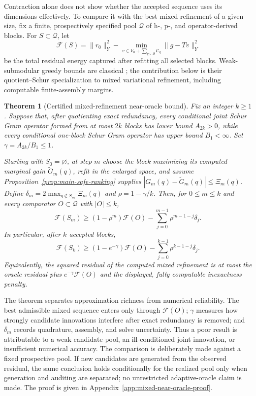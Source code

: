\documentclass[11pt]{article}
\newtheorem{theorem}{Theorem}[section]
\numberwithin{algorithm}{section}
\theoremstyle{definition}\newtheorem{definition}[theorem]{Definition}
\theoremstyle{remark}\newtheorem{remark}[theorem]{Remark}
\begin{document}
Contraction alone does not show whether the accepted sequence uses its
dimensions effectively.  To compare it with the best mixed refinement of a
given size, fix a finite, prospectively specified pool $\mathcal Q$ of h-, p-,
and operator-derived blocks.  For $S\subset\mathcal Q$, let
\begin{equation}
 \mathcal F(S)=\|r_0\|_Y^2-
 \min_{v\in V_0+\sum_{q\in S}\mathcal C_q}\|g-Tv\|_Y^2
 \label{eq:captured-gain-set-function}
\end{equation}
be the total residual energy captured after refitting all selected blocks.
Weak-submodular greedy bounds are classical
\cite{elenbergetal2018}; the contribution below is their quotient--Schur
specialization to mixed variational refinement, including computable
finite-assembly margins.

\begin{theorem}[Certified mixed-refinement near-oracle bound]
\label{thm:mixed-near-oracle}
Fix an integer $k\geq1$.  Suppose that, after quotienting exact redundancy,
every conditional joint Schur Gram operator formed from at most $2k$ blocks
has lower bound $A_{2k}>0$, while every conditional one-block Schur Gram
operator has upper bound $B_1<\infty$.  Set
$\gamma=A_{2k}/B_1\leq1$.

Starting with $S_0=\varnothing$, at step $m$ choose the block maximizing its
computed marginal gain $\widetilde G_m(q)$, refit in the enlarged space, and
assume Proposition~\ref{prop:main-safe-ranking} supplies
$|G_m(q)-\widetilde G_m(q)|\leq\Xi_m(q)$.  Define
$\delta_m=2\max_{q\notin S_m}\Xi_m(q)$ and
$\rho=1-\gamma/k$.  Then, for $0\leq m\leq k$ and every comparator
$O\subset\mathcal Q$ with $|O|\leq k$,
\begin{equation}
 \mathcal F(S_m)\geq
 (1-\rho^m)\mathcal F(O)
 -\sum_{j=0}^{m-1}\rho^{m-1-j}\delta_j .
 \label{eq:mixed-near-oracle}
\end{equation}
In particular, after $k$ accepted blocks,
\begin{equation}
 \mathcal F(S_k)\geq
 (1-e^{-\gamma})\mathcal F(O)
 -\sum_{j=0}^{k-1}\rho^{k-1-j}\delta_j .
 \label{eq:mixed-near-oracle-k}
\end{equation}
Equivalently, the squared residual of the computed mixed refinement is at
most the oracle residual plus
$e^{-\gamma}\mathcal F(O)$ and the displayed, fully computable inexactness
penalty.
\end{theorem}

The theorem separates approximation richness from numerical reliability.
The best admissible mixed sequence enters only through $\mathcal F(O)$;
$\gamma$ measures how strongly candidate innovations interfere after exact
redundancy is removed; and $\delta_m$ records quadrature, assembly, and solve
uncertainty.  Thus a poor result is attributable to a weak candidate pool, an
ill-conditioned joint innovation, or insufficient numerical accuracy.  The
comparison is deliberately made against a fixed prospective pool.  If new
candidates are generated from the observed residual, the same conclusion
holds conditionally for the realized pool only when generation and auditing
are separated; no unrestricted adaptive-oracle claim is made.
The proof is given in Appendix~\ref{app:mixed-near-oracle-proof}.
\end{document}

